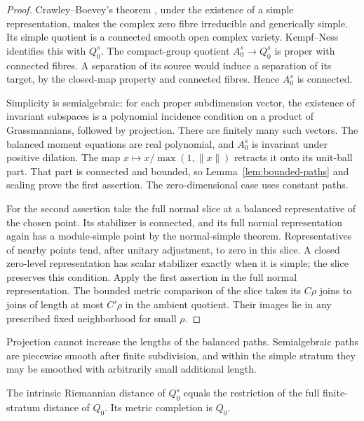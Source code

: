 \begin{proof}
Crawley--Boevey's theorem \cite[Theorem~1.2]{crawleyboevey},
under the existence of a simple representation, makes the complex
zero fibre irreducible and generically simple. Its simple quotient
is a connected smooth open complex variety. Kempf--Ness identifies
this with \(Q_0^s\). The compact-group quotient
\(A_0^s\to Q_0^s\) is proper with connected fibres. A separation
of its source would induce a separation of its target, by the
closed-map property and connected fibres. Hence \(A_0^s\) is connected.

Simplicity is semialgebraic: for each proper subdimension vector,
the existence of invariant subspaces is a polynomial incidence
condition on a product of Grassmannians, followed by projection.
There are finitely many such vectors. The balanced moment equations
are real polynomial, and \(A_0^s\) is invariant under positive
dilation. The map \(x\mapsto x/\max(1,\|x\|)\) retracts it onto its
unit-ball part. That part is connected and bounded, so
Lemma~\ref{lem:bounded-paths} and scaling prove the first assertion.
The zero-dimensional case uses constant paths.

For the second assertion take the full normal slice at a balanced
representative of the chosen point. Its stabilizer is connected,
and its full normal representation again has a module-simple point
by the normal-simple theorem. Representatives of nearby points
tend, after unitary adjustment, to zero in this slice.
A closed zero-level representation has scalar stabilizer exactly
when it is simple; the slice preserves this condition.
Apply the first assertion in the full normal representation.
The bounded metric comparison of the slice takes its \(C\rho\)
joins to joins of length at most \(C'\rho\) in the ambient quotient.
Their images lie in any prescribed fixed neighborhood for small
\(\rho\).
\end{proof}

Projection cannot increase the lengths of the balanced paths.
Semialgebraic paths are piecewise smooth after finite subdivision,
and within the simple stratum they may be smoothed with arbitrarily
small additional length.

\begin{proposition}\label{prop:principal-completion}
The intrinsic Riemannian distance of \(Q_0^s\) equals the restriction
of the full finite-stratum distance of \(Q_0\).
Its metric completion is \(Q_0\).
\end{proposition}

